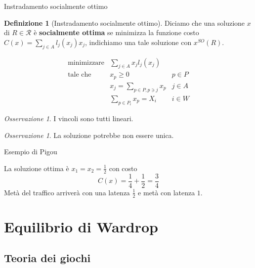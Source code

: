 \documentclass{beamer}
\newcounter{counter1}
\theoremstyle{plain}
\theoremstyle{definition}
\newtheorem{mydef}[counter1]{Definizione}
\theoremstyle{remark}
\newtheorem{myoss}[counter1]{Osservazione}
\begin{document}
\begin{frame}{Instradamento socialmente ottimo}
  \begin{mydef}[Instradamento socialmente ottimo]
    Diciamo che una soluzione $x$ di $R \in \mathcal{R}$ è
    \textbf{socialmente ottima} se minimizza la funzione costo
    $C(x) = \sum_{j\in A} l_j(x_j)x_j$, indichiamo una tale soluzione
    con $x^{SO}(R)$.
  \end{mydef}
  \[
    \begin{matrix}
      \text{minimizzare} & \sum _{j\in A} x_j l_j(x_j) \\
      \text{tale che} &   x_p \ge 0 & p\in P \\
      & x_j = \sum_{p\in P,p\ni j} x_p & j\in A \\
      &\sum_{p\in P_i} x_p = X_i & i\in W
    \end{matrix}
  \]
  \begin{myoss}
    I vincoli sono tutti lineari.
  \end{myoss}
  \begin{myoss}
    La soluzione potrebbe non essere unica.
  \end{myoss}
\end{frame}

\begin{frame}{Esempio di Pigou}
  \begin{center}
  \end{center}
  La soluzione ottima è $x_1 = x_2 = \frac{1}{2}$ con costo
  \[ C(x) = \frac{1}{4} + \frac{1}{2} = \frac{3}{4} \]
  Metà del traffico arriverà con una latenza $\frac{1}{2}$ e metà con
  latenza $1$.
\end{frame}

\section{Equilibrio di Wardrop}

\subsection{Teoria dei giochi}
\end{document}
